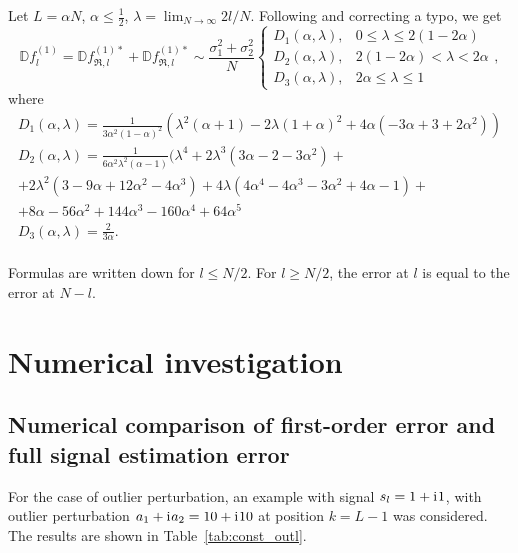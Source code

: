 \documentclass[engproc, submit, article,pdftex,moreauthors]{Definitions/mdpi}
\newcommand{\iu}{\mathrm{i}\mkern1mu}
\begin{document}
Let $L = \alpha N$, $\alpha \leq \frac{1}{2}$, $\lambda = \lim_{N\to\infty} 2 l / N$. Following \cite{Golyandina.Vlassieva2009} and correcting a typo, we get
\begin{equation}
\label{eq:const_noise}
\mathbb{D} f^{(1)}_l = \mathbb{D} f^{(1)*}_{\Re, l} + \mathbb{D} f^{(1)*}_{\Re, l} \sim \frac{\sigma^2_1 + \sigma^2_2}{N}
\begin{cases}
	D_1(\alpha, \lambda), &\text{$0 \leq \lambda \leq 2 (1 - 2\alpha)$}\\
	D_2(\alpha, \lambda), &\text{$2 (1 - 2\alpha) < \lambda < 2\alpha$}\\
	D_3(\alpha, \lambda), &\text{$2\alpha \leq \lambda \leq 1$}
\end{cases},
\end{equation}
where
\begin{gather*}
	D_1(\alpha, \lambda) = \frac{1}{3 \alpha^2(1 - \alpha)^2} (\lambda^2(\alpha + 1) - 2\lambda(1 + \alpha)^2 + 4 \alpha(-3\alpha + 3 + 2\alpha^2))\\
	D_2(\alpha, \lambda) = \frac{1}{6 \alpha^2\lambda^2 (\alpha - 1)} (\lambda^4 + 2\lambda^3(3\alpha -2 -3\alpha^2) + \\
	+ 2\lambda^2(3 - 9\alpha + 12\alpha^2 - 4\alpha^3) + 4\lambda(4 \alpha^4 - 4\alpha^3 - 3\alpha^2 + 4\alpha - 1) +\\
	+ 8\alpha - 56 \alpha^2 + 144\alpha^3 - 160\alpha^4 + 64\alpha^5\\
	D_3(\alpha, \lambda) = \frac{2}{3\alpha}.\\
\end{gather*}

Formulas are written down for $l\le N/2$. For $l\ge N/2$, the error  at $l$ is equal to the error at $N-l$. 

\section{Numerical investigation}
\subsection{Numerical comparison of first-order error and full signal estimation error}
\label{sec:results}

For the case of outlier perturbation, an example with signal $s_l = 1 + \iu 1$, with outlier perturbation $a_1 + \iu a_2 = 10 + \iu 10$ at position $k = L - 1$ was considered. The results are shown in Table~\ref{tab:const_outl}.
\end{document}
